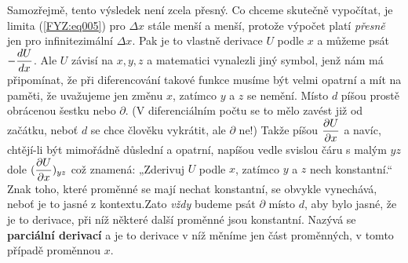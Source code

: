 {    Samozřejmě, tento výsledek není zcela přesný. Co chceme skutečně vypočítat, je limita 
    (\ref{FYZ:eq005}) pro \(\Delta x\) stále menší a menší, protože výpočet platí \emph{přesně} 
    jen pro infinitezimální \(\Delta x\). Pak je to vlastně derivace \(U\) podle \(x\) a můžeme 
    psát \(-\dfrac{d U}{d x}\). Ale \(U\) závisí na \(x, y, z\) a matematici vynalezli jiný symbol, jenž 
    nám má připomínat, že při diferencování takové funkce musíme být velmi opatrní a mít na paměti, 
    že uvažujeme jen změnu \(x\), zatímco \(y\) a \(z\) se nemění. Místo \(d\) píšou prostě 
    obrácenou šestku nebo \(\partial\). (V diferenciálním počtu se to mělo zavést již od začátku, 
    neboť \(d\) se chce člověku vykrátit, ale \(\partial\) ne!) Takže píšou \(\dfrac{\partial U}{\partial x}\) a 
    navíc, chtějí-li být mimořádně důslední a opatrní, napíšou vedle svislou čáru s malým \(yz\) 
    dole  \((\dfrac{\partial U}{\partial x})_{yz}\) což znamená: „Zderivuj \(U\) podle \(x\), zatímco \(y\) a \(z\) 
    nech konstantní.“ Znak toho, které proměnné se mají nechat konstantní, se obvykle vynechává, 
    neboť je to jasné z kontextu.Zato \emph{vždy} budeme psát \(\partial\) místo \(d\), aby bylo 
    jasné, že je to derivace, při níž některé další proměnné jsou konstantní. Nazývá se 
    \textbf{parciální derivací} a je to derivace v níž měníme jen část proměnných, v tomto případě 
    proměnnou \(x\).
    
}
